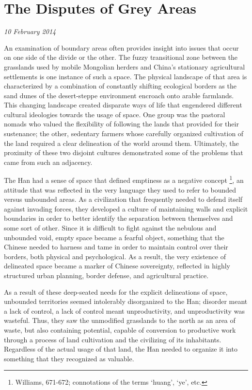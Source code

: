 \section{The Disputes of Grey Areas}

\textit{10 February 2014}

An examination of boundary areas often provides insight into issues
that occur on one side of the divide or the other. The fuzzy
transitional zone between the grasslands used by mobile Mongolian herders and
China's stationary agricultural settlements is one instance of
such a space.  The physical landscape of that area is characterized by
a combination of constantly shifting ecological borders as the sand
dunes of the desert-steppe environment encroach onto arable farmlands.
This changing landscape created disparate ways of life that engendered
different cultural ideologies towards the usage of space. One group
was the pastoral nomads who valued the flexibility of
following the lands that provided for their sustenance; the other,
sedentary farmers whose carefully organized cultivation of the land
required a clear delineation of the world around them. Ultimately, the
proximity of these two disjoint cultures demonstrated some of the
problems that came from such an adjacency.

The Han had a sense of space that defined emptiness as a
negative concept \footnote{Williams, 671-672; connotations of the terms `huang', `ye', etc.}, an attitude that was
reflected in the very language they used to refer to bounded versus
unbounded areas. As a civilization that frequently needed to defend itself
against invading forces, they developed a culture of maintaining walls and
explicit boundaries in order to better identify the
separation between themselves and some sort of other. Since it is difficult to
fight against the nebulous and unbounded void, empty space became a
fearful object, something that the Chinese needed to harness and
tame in order to maintain control over their borders, both physical and
psychological. As a result, the very existence of delineated space
became a marker of Chinese sovereignty, reflected in highly structured
urban planning, border defense, and agricultural practice.

As a result of  these deep-seated needs for the explicit delineations
of space, unbounded territories seemed intolerably disorganized to the
Han; disorder meant a lack of control, a lack of control meant
unproductivity, and unproductivity was wasteful.  Thus, they saw the
unmodified grasslands to the north as an area of
waste, but also containing potential, capable of conversion to productive work through a
process of land cultivation and the civilizing of its inhabitants.
Regardless of the actual usage of that land, the Han needed to
organize it into something that they recognized as valuable.


